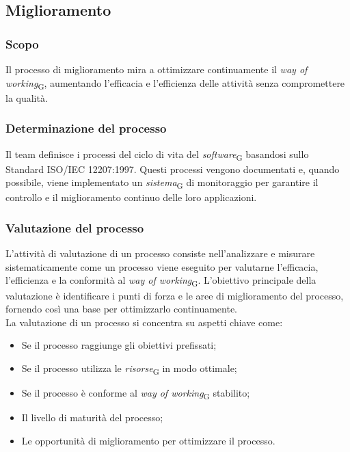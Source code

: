 \subsection{Miglioramento}
\subsubsection{Scopo}
Il processo di miglioramento mira a ottimizzare continuamente il \textit{way of working}\textsubscript{G}, aumentando l’efficacia e l’efficienza delle attività senza compromettere la qualità.

\subsubsection{Determinazione del processo}
Il team definisce i processi del ciclo di vita del \textit{software}\textsubscript{G} basandosi sullo Standard ISO/IEC 12207:1997. Questi processi vengono documentati e, quando possibile, viene implementato un \textit{sistema}\textsubscript{G} di monitoraggio per garantire il controllo e il miglioramento continuo delle loro applicazioni.

\subsubsection{Valutazione del processo}
L'attività di valutazione di un processo consiste nell'analizzare e misurare sistematicamente come un processo viene eseguito per valutarne l'efficacia, l'efficienza e la conformità al \textit{way of working}\textsubscript{G}. L'obiettivo principale della valutazione è identificare i punti di forza e le aree di miglioramento del processo, fornendo così una base per ottimizzarlo continuamente. \\
La valutazione di un processo si concentra su aspetti chiave come:
\begin{itemize}
    \item Se il processo raggiunge gli obiettivi prefissati;
    \item Se il processo utilizza le \textit{risorse}\textsubscript{G} in modo ottimale;
    \item Se il processo è conforme al \textit{way of working}\textsubscript{G} stabilito;
    \item Il livello di maturità del processo;
    \item Le opportunità di miglioramento per ottimizzare il processo.
\end{itemize}

